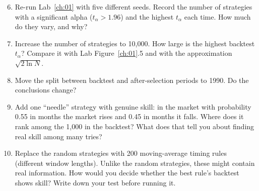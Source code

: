 \begin{enumerate}
  \setcounter{enumi}{5}
  \item Re-run Lab~\ref{ch:01} with five different seeds. Record the number of strategies with a significant alpha ($t_\alpha > 1.96$) and the highest $t_\alpha$ each time. How much do they vary, and why?
  \item Increase the number of strategies to 10,000. How large is the highest backtest $t_\alpha$? Compare it with Lab Figure~\ref{ch:01}.5 and with the approximation $\sqrt{2 \ln N}$.
  \item Move the split between backtest and after-selection periods to 1990. Do the conclusions change?
  \item Add one ``needle'' strategy with genuine skill: in the market with probability 0.55 in months the market rises and 0.45 in months it falls. Where does it rank among the 1,000 in the backtest? What does that tell you about finding real skill among many tries?
  \item Replace the random strategies with 200 moving-average timing rules (different window lengths). Unlike the random strategies, these might contain real information. How would you decide whether the best rule's backtest shows skill? Write down your test before running it.
\end{enumerate}
